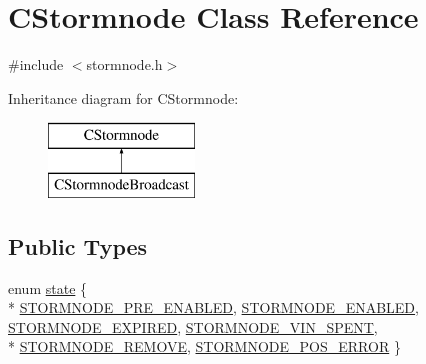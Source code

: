 \hypertarget{class_c_stormnode}{}\section{C\+Stormnode Class Reference}
\label{class_c_stormnode}


{\ttfamily \#include $<$stormnode.\+h$>$}

Inheritance diagram for C\+Stormnode\+:\begin{figure}[H]
\begin{center}
\leavevmode
\includegraphics[height=2.000000cm]{class_c_stormnode}
\end{center}
\end{figure}
\subsection*{Public Types}
\begin{DoxyCompactItemize}
\item 
enum \hyperlink{class_c_stormnode_a8c9a83b0ce70988102d71ecfabe99aa0}{state} \{ \\*
\hyperlink{class_c_stormnode_a8c9a83b0ce70988102d71ecfabe99aa0a4d96c08f8f4c62ae9e43b0d82db5e2f1}{S\+T\+O\+R\+M\+N\+O\+D\+E\+\_\+\+P\+R\+E\+\_\+\+E\+N\+A\+B\+L\+E\+D}, 
\hyperlink{class_c_stormnode_a8c9a83b0ce70988102d71ecfabe99aa0a4af8128443469b549a0c4d6cf59a3a79}{S\+T\+O\+R\+M\+N\+O\+D\+E\+\_\+\+E\+N\+A\+B\+L\+E\+D}, 
\hyperlink{class_c_stormnode_a8c9a83b0ce70988102d71ecfabe99aa0ab3e35c4e3e07236ee4bdd2fc0cc11f99}{S\+T\+O\+R\+M\+N\+O\+D\+E\+\_\+\+E\+X\+P\+I\+R\+E\+D}, 
\hyperlink{class_c_stormnode_a8c9a83b0ce70988102d71ecfabe99aa0abe760cfa737f943c06d449afc2b03f1d}{S\+T\+O\+R\+M\+N\+O\+D\+E\+\_\+\+V\+I\+N\+\_\+\+S\+P\+E\+N\+T}, 
\\*
\hyperlink{class_c_stormnode_a8c9a83b0ce70988102d71ecfabe99aa0a89fa3f4b7441a2d2add5334396a88b06}{S\+T\+O\+R\+M\+N\+O\+D\+E\+\_\+\+R\+E\+M\+O\+V\+E}, 
\hyperlink{class_c_stormnode_a8c9a83b0ce70988102d71ecfabe99aa0a61dac974c55abf841bb617fa4beba96e}{S\+T\+O\+R\+M\+N\+O\+D\+E\+\_\+\+P\+O\+S\+\_\+\+E\+R\+R\+O\+R}
 \}
\end{DoxyCompactItemize}
